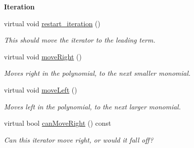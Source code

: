 \begin{Indent}\textbf{ Iteration}\par
\begin{DoxyCompactItemize}
\item 
\mbox{\label{class_constant___polynomial___iterator_a061fee4b1e6a986fb8849f4cd8232069}} 
virtual void \hyperlink{class_constant___polynomial___iterator_a061fee4b1e6a986fb8849f4cd8232069}{restart\+\_\+iteration} ()
\begin{DoxyCompactList}\small\item\em This should move the iterator to the leading term. \end{DoxyCompactList}\item 
\mbox{\label{class_constant___polynomial___iterator_aa883e32fd7f387438e71c9ee72271bf4}} 
virtual void \hyperlink{class_constant___polynomial___iterator_aa883e32fd7f387438e71c9ee72271bf4}{move\+Right} ()
\begin{DoxyCompactList}\small\item\em Moves right in the polynomial, to the next smaller monomial. \end{DoxyCompactList}\item 
\mbox{\label{class_constant___polynomial___iterator_a555ff7a66ef121e3a22ac0af11267d7f}} 
virtual void \hyperlink{class_constant___polynomial___iterator_a555ff7a66ef121e3a22ac0af11267d7f}{move\+Left} ()
\begin{DoxyCompactList}\small\item\em Moves left in the polynomial, to the next larger monomial. \end{DoxyCompactList}\item 
\mbox{\label{class_constant___polynomial___iterator_a2937aec97898259569493986a2acb3ee}} 
virtual bool \hyperlink{class_constant___polynomial___iterator_a2937aec97898259569493986a2acb3ee}{can\+Move\+Right} () const
\begin{DoxyCompactList}\small\item\em Can this iterator move right, or would it fall off? \end{DoxyCompactList}\item 
\mbox{\label{class_constant___polynomial___iterator_a6a29432be1533bb5850c7940984596c3}} 

\end{DoxyCompactItemize}
\end{Indent}

